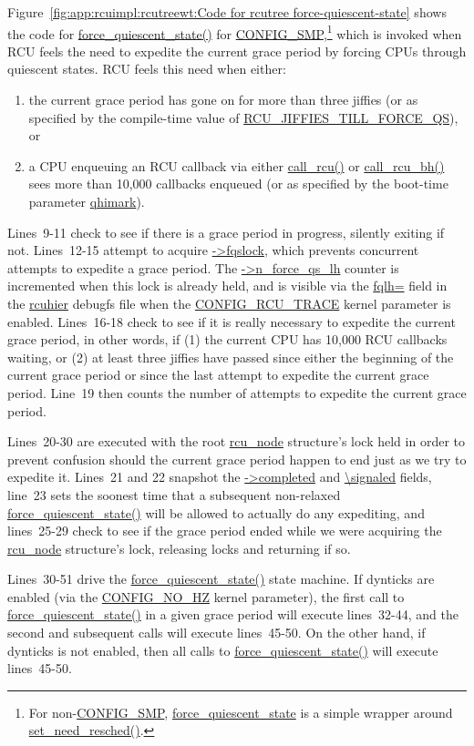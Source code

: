 Figure~\ref{fig:app:rcuimpl:rcutreewt:Code for rcutree force-quiescent-state}
shows the code for \url{force_quiescent_state()} for
\url{CONFIG_SMP},\footnote{
	For non-\url{CONFIG_SMP}, \url{force_quiescent_state} is a
	simple wrapper around \url{set_need_resched()}.}
which is invoked when RCU feels the need to expedite the current
grace period by forcing CPUs through quiescent states.
RCU feels this need when either:
\begin{enumerate}
\item	the current grace period has gone on for more than three jiffies
	(or as specified by the compile-time value of
	\url{RCU_JIFFIES_TILL_FORCE_QS}), or
\item	a CPU enqueuing an RCU callback via either \url{call_rcu()}
	or \url{call_rcu_bh()} sees more than 10,000 callbacks enqueued
	(or as specified by the boot-time parameter \url{qhimark}).
\end{enumerate}

Lines~9-11 check to see if there is a grace period in progress,
silently exiting if not.
Lines~12-15 attempt to acquire \url{->fqslock}, which prevents concurrent
attempts to expedite a grace period.
The \url{->n_force_qs_lh} counter is incremented when this lock is
already held, and is visible via the \url{fqlh=} field
in the \url{rcuhier} debugfs file when the \url{CONFIG_RCU_TRACE} kernel
parameter is enabled.
Lines~16-18 check to see if it is really necessary to expedite the
current grace period, in other words, if (1) the current CPU has 10,000
RCU callbacks waiting, or (2) at least three jiffies have passed
since either the beginning of the current grace period or since the
last attempt to expedite the current grace period.
Line~19 then counts the number of attempts to expedite the current
grace period.

Lines~20-30 are executed with the root \url{rcu_node} structure's lock
held in order to prevent confusion should the current grace period
happen to end just as we try to expedite it.
Lines~21 and 22 snapshot the \url{->completed} and \url{\signaled} fields,
line~23 sets the soonest time that a subsequent non-relaxed
\url{force_quiescent_state()} will be allowed to actually do
any expediting, and lines~25-29 check to see if the grace period
ended while we were acquiring the \url{rcu_node} structure's lock,
releasing locks and returning if so.

Lines~30-51 drive the \url{force_quiescent_state()} state machine.
If dynticks are enabled (via the \url{CONFIG_NO_HZ} kernel
parameter), the first call
to \url{force_quiescent_state()} in a given grace period will
execute lines~32-44, and the second and subsequent calls will
execute lines~45-50.
On the other hand, if dynticks is not enabled, then all calls to
\url{force_quiescent_state()} will execute lines~45-50.

